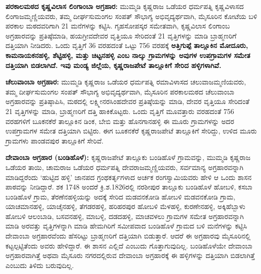 \vskip -2pt

\textbf{ಪರಕಾಲಮಠದ ಕೃಷ್ಣವಿಲಾಸ ಲಿಂಗಾಂಬಾ ಅಗ್ರಹಾರ:} ಮುಮ್ಮಡಿ ಕೃಷ್ಣರಾಜ ಒಡೆಯರ ಧರ್ಮಪತ್ನಿ ಕೃಷ್ಣವಿಳಾಸದ ಲಿಂಗಾಜಮ್ಮಣ್ಣಿಯವರು, ತಮ್ಮ ದೀರ್ಘಸುಮಂಗಲ ಸಂಪತ್​ ಸೌಭಾಗ್ಯ ಅಭಿವೃದ್ಯರ್ಥವಾಗಿ, ಮೈಸೂರಿನ ಕೋಟೆಯ ಬಳಿ ಪರಕಾಲ ಮಠದವರಿಗಾಗಿ 21 ಮನೆಗಳನ್ನು ಕಟ್ಟಿಸಿ. ಗೃಹಸೋಪಸ್ಕರ ಸಮೇತವಾಗಿ, ಕೃಷ್ಣವಿಲಾಸ ಲಿಂಗಾಂಬ ಅಗ್ರಹಾರವನ್ನು ಪ್ರತಿಷ್ಠೆಮಾಡಿ, ಹಯಗ್ರೀವದೇವರ ವೃತ್ತಿಯೂ ಸೇರಿದಂತೆ 21 ವೃತ್ತಿಗಳನ್ನು ಮಾಡಿ ಬ್ರಾಹ್ಮಣರಿಗೆ ದತ್ತಿಯಾಗಿ ನೀಡಿದರು. ಒಂದು ವೃತ್ತಿಗೆ 36 ವರಹದಂತೆ ಒಟ್ಟು 756 ವರಹಕ್ಕೆ \textbf{ಅತ್ತಿಗುಪ್ಪೆ ತಾಲ್ಲೂಕಿನ ಮೋದೂರು, ಕಾಮನಾಯಕನಹಳ್ಳಿ, ಶೆಟ್ಟಿಹಳ್ಳಿ, ಮತ್ತು ಚಿಟ್ಟನಹಳ್ಳಿ ಎಂಬ ನಾಲ್ಕು ಗ್ರಾಮಗಳನ್ನು ಅವುಗಳ ಉಪಗ್ರಾಮಗಳ ಸಮೇತ ದತ್ತಿಯಾಗಿ ಬಿಡಲಾಗಿದೆ. ಇವು ಮಂಡ್ಯ ಜಿಲ್ಲೆಯ, ಕೃಷ್ಣರಾಜಪೇಟೆ ತಾಲ್ಲೂಕಿಗೆ ಸೇರಿದ ಹಳ್ಳಿಗಳಾಗಿವೆ. }

\vskip -2pt

\textbf{ಚೆಲುವಾಂಬಾ ಅಗ್ರಹಾರ:} ಮುಮ್ಮಡಿ ಕೃಷ್ಣರಾಜ ಒಡೆಯರ ಧರ್ಮಪತ್ನಿ ರಮಾವಿಳಾಸದ ಚಲುವಾಜಮ್ಮಣಿಯವರು, ತಮ್ಮ ದೀರ್ಘಸುಮಂಗಲ ಸಂಪತ್​ ಸೌಭಾಗ್ಯ ಅಭಿವೃದ್ಯರ್ಥವಾಗಿ, ಮೈಸೂರಿನ ಪರಕಾಲಮಠದ ಚೆಲುವಾಂಬಾ ಅಗ್ರಹಾರವನ್ನು ಪ್ರತಿಷ್ಠಾಪಿಸಿ, ಮಠದಲ್ಲಿ ಲಕ್ಷ್ಮೀನರಸಿಂಹದೇವರ ಪ್ರತಿಷ್ಠೆಯನ್ನು ಮಾಡಿ, ದೇವರ ವೃತ್ತಿಯೂ ಸೇರಿದಂತೆ 21 ವೃತ್ತಿಗಳನ್ನು ಮಾಡಿ, ಬ್ರಾಹ್ಮಣರಿಗೆ ದತ್ತಿ ಹಾಕಿಕೊಟ್ಟರು. ಒಂದು ವೃತ್ತಿಗೆ ಮೂವತ್ತಾರು ವರಹದಂತೆ 756 ವರಹಗಳಿಗೆ ಬೂಕನಕೆರೆ ತಾಲ್ಲೂಕಿನ ಡಿಂಕ, ಬೇಬಿ ಮತ್ತು ಹೊನಗಾನಹಳ್ಳಿ ಈ ಮೂರು ಗ್ರಾಮಗಳನ್ನು ಅದರ ಉಪಗ್ರಾಮಗಳ ಸಮೇತ ದತ್ತಿಯಾಗಿ ಬಿಟ್ಟಿರು. ಈಗ ಬೂಕನಕೆರೆ ಕೃಷ್ಣರಾಜಪೇಟೆ ತಾಲ್ಲೂಕಿಗೆ ಸೇರಿದ್ದು, ಉಳಿದ ಮೂರು ಗ್ರಾಮಗಳು ಪಾಂಡವಪುರ ತಾಲ್ಲೂಕಿಗೆ ಸೇರಿವೆ.

\vskip -2pt

\textbf{ದೇವಾಂಬಾ ಅಗ್ರಹಾರ (ಬಂಡಿಹೊಳೆ):} ಕೃಷ್ಣರಾಜಪೇಟೆ ತಾಲ್ಲೂಕು ಬಂಡಿಹೊಳೆ ಗ್ರಾಮವನ್ನು, ಮುಮ್ಮಡಿ ಕೃಷ್ಣರಾಜ ಒಡೆಯರ ತಾಯಿ, ಚಾಮರಾಜ ಒಡೆಯರ ಧರ್ಮಪತ್ನಿ ದೇವರಾಜಮ್ಮಣ್ಣಿಯವರು, ಸರ್ವಮಾನ್ಯ ಅಗ್ರಹಾರವನ್ನಾಗಿ ಮಾಡಿದ್ದರೆಂದು `ಹುಟ್ಟಿದ ಹಳ್ಳಿ' ಜಾನಪದ ಗ್ರಂಥಕರ್ತೃಗಳಾದ ಅರ್ಚಕ ರಂಗಸ್ವಾಮಿಯವರು ಹೇಳಿ ಆ ಒಂದು ಶಾಸನ ಪಾಠವನ್ನು ನೀಡಿದ್ದಾರೆ. ಶಕ 1748 ಅಂದರೆ ಕ್ರಿ.ಶ.1826ರಲ್ಲಿ ನರಶೀಪುರ ತಾಲ್ಲೂಕು ಬಂಡಿಹೊಳೆ ಹೋಬಳಿ, ಕಸಬಾ ಬಂಡಿಹೊಳೆ ಗ್ರಾಮ, ತೆರಣೆನಹಳ್ಳಿಯನ್ನು ಅದಕ್ಕೆ ಸೇರಿದ ಮಡವನಕೋಡಿ ಹೋಬಳಿ ಮಡವನಕೋಡಿ ಗ್ರಾಮ, ಯಾಚಮಾನ\-ಹಳ್ಳಿ, ಯಾಚೈನಹಳ್ಳಿ, ತೆಗಡರಹಳ್ಳಿ, ಹರಿಹರಪುರ ಹೋಬಳಿ ಮೆಳಹಳ್ಳಿ, ಕುರಣೇನಹಳ್ಳಿ, ಅಕ್ಕಿಹೆಬ್ಬಾಳು ಹೋಬಳಿ ಆಲಂಬಾಡಿ, ಬಸವನಹಳ್ಳಿ, ಮಾಬಳ್ಳಿ, ದಡದಹಳ್ಳಿ, ಮಾಚವಳಲು ಗ್ರಾಮಗಳ ಸಮೇತ ಅಗ್ರಹಾರವನ್ನಾಗಿ ಮಾಡಿ ಅರವತ್ತು ವೃತ್ತಿಗಳನ್ನಾಗಿ ಮಾಡಿ ಹೇಮಗಿರಿಗೆ ಸಮೀಪವಾದ ಬಂಡಿಹೊಳೆ ಗ್ರಾಮದ ಬಳಿ ಮನೆಗಳನ್ನು ಕಟ್ಟಿಸಿ ದೇವಾಂಬಾ ಅಗ್ರಹಾರವೆಂದು ಹೆಸರಿಟ್ಟು ಬ್ರಾಹ್ಮಣರಿಗೆ ದತ್ತಿಯಾಗಿ ಬಿಡುತ್ತಾರೆ. ಆದರೆ ಈ ಅಗ್ರಹಾರವು ಮೈಸೂರಿನಲ್ಲಿ ಕಟ್ಟಲ್ಪಟ್ಟಿತೆಂದು ಅವರು ಹೇಳಿದ್ದಾರೆ. ಈ ಶಾಸನ ಎಲ್ಲಿದೆ ಎಂಬುದು ಗೊತ್ತಾಗುವುದಿಲ್ಲ. ಬಂಡಿಹೊಳೆಯೇ ದೇವಾಂಬಾ ಅಗ್ರಹಾರವಾಗಿತ್ತೆ ಅಥವಾ ಮೈಸೂರು ನಗರದಲ್ಲಿರುವ ದೇವಾಂಬಾ ಅಗ್ರಹಾರಕ್ಕೆ ಈ ಹಳ್ಳಿಗಳನ್ನು ದತ್ತಿಯಾಗಿ ಬಿಡಲಾಗಿತ್ತೆ ಎಂಬುದು ತಿಳಿದು ಬರುವುದಿಲ್ಲ.


